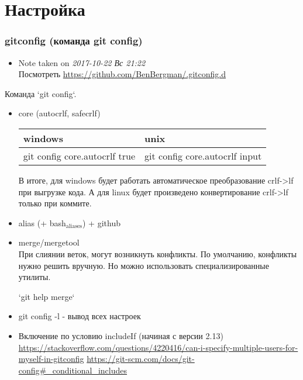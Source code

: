 \documentclass[bigger]{beamer}
\begin{document}
\section{Настройка}
\label{sec-2}
\begin{frame}
\frametitle{gitconfig (команда git config)}
\label{sec-2-1}

\begin{itemize}
\item Note taken on \textit{2017-10-22 Вс 21:22} \\
Посмотреть \href{https://github.com/BenBergman/.gitconfig.d}{https://github.com/BenBergman/.gitconfig.d}
\end{itemize}
Команда `git config`. 
\begin{itemize}

\item core (autocrlf, safecrlf)\\
\label{sec-2-1-1}%
\begin{center}
\begin{tabular}{ll}
 windows                        &  unix                            \\
\hline
 git config core.autocrlf true  &  git config core.autocrlf input  \\
\end{tabular}
\end{center}


В итоге, для windows будет работать автоматическое преобразование
crlf->lf при выгрузке кода. А для linux будет произведено
конвертирование crlf->lf только при коммите.

\item alias (+ bash$_{\mathrm{aliases}}$) + github
\label{sec-2-1-2}%

\item merge/mergetool\\
\label{sec-2-1-3}%
При слиянии веток, могут возникнуть конфликты. По умолчанию, конфликты
нужно решить вручную. Но можно использовать специализированные
утилиты.

`git help merge`

\item git config -l - вывод всех настроек
\label{sec-2-1-4}%

\item Включение по условию includeIf (начиная с версии 2.13)\\
\label{sec-2-1-5}%
\href{https://stackoverflow.com/questions/4220416/can-i-specify-multiple-users-for-myself-in-gitconfig}{https://stackoverflow.com/questions/4220416/can-i-specify-multiple-users-for-myself-in-gitconfig}
\href{https://git-scm.com/docs/git-config#_conditional_includes}{https://git-scm.com/docs/git-config\#\_conditional\_includes}
\end{itemize} %
\end{frame}
\end{document}
